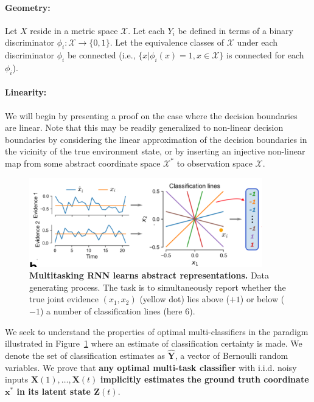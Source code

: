 \documentclass[12pt]{article}
\begin{document}
\paragraph{Geometry: } Let $X$ reside in a metric space $\mathcal X$. 
Let each $Y_i$ be defined in terms of a binary discriminator $\phi_i: \mathcal X \to \{0, 1\}$. 
Let the equivalence classes of $\mathcal X$ under each discriminator $\phi_i$ be connected (i.e., $\{x | \phi_i(x) = 1, x\in \mathcal X\}$ is connected for each $\phi_i$).


\paragraph{Linearity: } We will begin by presenting a proof on the case where
the decision boundaries are linear. Note that this may be readily generalized
to non-linear decision boundaries by considering the linear approximation of
the decision boundaries in the vicinity of the true environment state, or by
inserting an injective non-linear map from some abstract coordinate space
$\mathcal X^*$ to observation space $\mathcal X$. 


\begin{figure}[h! tbp]
	\centering 
	\includegraphics[width=0.9\textwidth]{media/multitask_fig2a.png}
	\caption[Multitasking RNN learns abstract representations]{\textbf{Multitasking RNN learns abstract representations. } Data generating process. The task is to simultaneously report whether the true joint evidence $(x_1,x_2)$ (yellow dot) lies above ($+1$) or below ($-1$) a number of classification lines (here 6).}
	\label{fig:2a}
\end{figure}


% 
We seek to understand the properties of optimal multi-classifiers in the paradigm illustrated in Figure~\ref{fig:2a} where an estimate of classification certainty is made. 
We denote the set of classification estimates as $\hat{\mathbf Y}$, a vector of Bernoulli random variables. 
We prove that \textbf{any optimal multi-task classifier} with i.i.d. noisy inputs $\mathbf X(1), \dots, \mathbf X(t)$ \textbf{implicitly estimates the ground truth coordinate $\mathbf x^*$ in its latent state $\mathbf Z(t)$}. 
\end{document}
